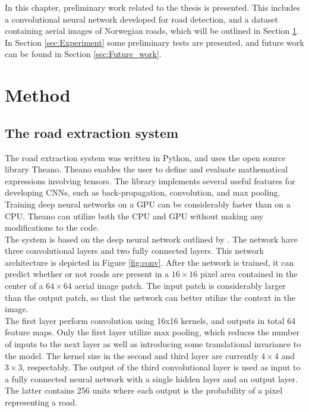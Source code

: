 In this chapter, preliminary work related to the thesis is presented. This includes a convolutional neural network developed for road detection, and a dataset containing aerial images of Norwegian roads, which will be outlined in Section \ref{sec:Method}. In Section \ref{sec:Experiment} some preliminary tests are presented, and future work can be found in Section \ref{sec:Future_work}. 

\section{Method}
\label{sec:Method}
\subsection{The road extraction system}
The road extraction system was written in Python, and uses the open source library Theano. Theano enables the user to define and evaluate mathematical expressions involving tensors. The library implements several useful features for developing \ac{CNN}s, such as back-propagation, convolution, and max pooling. Training deep neural networks on a \ac{GPU} can be considerably faster than on a \ac{CPU}. Theano can utilize both the \ac{CPU} and \ac{GPU} without making any modifications to the code.\\

The system is based on the deep neural network outlined by \cite{Mnih_aerial_images_noisy}. The network have three convolutional layers and two fully connected layers. This network architecture is depicted in Figure \ref{fig:conv}. After the network is trained, it can predict whether or not roads are present in a $16 \times 16$ pixel area contained in the center of a $64 \times 64$ aerial image patch. The input patch is considerably larger than the output patch, so that the network can better utilize the context in the image. \\

The first layer perform convolution using 16x16 kernels, and outputs in total 64 feature maps. Only the first layer utilize max pooling, which reduces the number of inputs to the next layer as well as introducing some translational invariance to the model. The kernel size in the second and third layer are currently $4 \times 4$ and $3 \times 3$, respectably. The output of the third convolutional layer is used as input to a fully connected neural network with a single hidden layer and an output layer. The latter contains 256 units where each output is the probability of a pixel representing a road.\\

